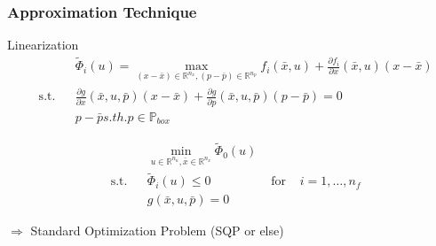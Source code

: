 \begin{frame}
	\frametitle{Approximation Technique}

\begin{block}{Linearization}
	\begin{align*}
	&&&\tilde{\Phi}_{i}(u)=\max_{(x-\bar{x})\in\mathbb{R}^{n_{x}}, (p-\bar{p})\in\mathbb{R}^{n_{p}}} f_{i}(\bar{x}, u)+\frac{\partial f_{i}}{\partial x}(\bar{x}, u)(x-\bar{x})\\
	&\text{s.t.} && \frac{\partial g}{\partial x}(\bar{x}, u, \bar{p})(x-\bar{x})+\frac{\partial g}{\partial p}(\bar{x}, u, \bar{p})(p-\bar{p})=0\\
	&&&p-\bar{p} s.th. p\in\mathbb{P}_{box}
	\end{align*}
	
\end{block}	
	

	
\begin{block}	

\begin{align*}
&&&\min_{u\in\mathbb{R}^{n_{u}}, \bar{x}\in\mathbb{R}^{n_{x}}} \tilde{\Phi}_{0}(u)\\
&\text{s.t.} &&  \tilde{\Phi}_{i}(u)\leq 0 & \text{ for } & i=1,\ldots,n_{f}\\
&&&g(\bar{x}, u, \bar{p})=0
\end{align*}
\end{block} 
	
$\Rightarrow$ Standard Optimization Problem (SQP or else)

\end{frame}
